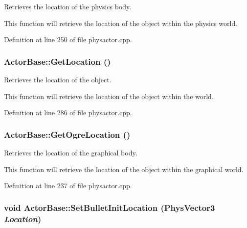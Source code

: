 Retrieves the location of the physics body. 

This function will retrieve the location of the object within the physics world. 

Definition at line 250 of file physactor.cpp.

\hypertarget{classActorBase_a9dfdaf0304e4a462b3b033fb254116af}{
\subsubsection[{GetLocation}]{ ActorBase::GetLocation ()}}
\label{dd/d7b/classActorBase_a9dfdaf0304e4a462b3b033fb254116af}


Retrieves the location of the object. 

This function will retrieve the location of the object within the world. 

Definition at line 286 of file physactor.cpp.

\hypertarget{classActorBase_a73ee03084b2ca78659b6e6439cafa75f}{
\subsubsection[{GetOgreLocation}]{ ActorBase::GetOgreLocation ()}}
\label{dd/d7b/classActorBase_a73ee03084b2ca78659b6e6439cafa75f}


Retrieves the location of the graphical body. 

This function will retrieve the location of the object within the graphical world. 

Definition at line 237 of file physactor.cpp.

\hypertarget{classActorBase_af52177760d530df2b0987ed8626a656d}{
\subsubsection[{SetBulletInitLocation}]{\setlength{\rightskip}{0pt plus 5cm}void ActorBase::SetBulletInitLocation ({\bf PhysVector3} {\em Location})}}
\label{dd/d7b/classActorBase_af52177760d530df2b0987ed8626a656d}



